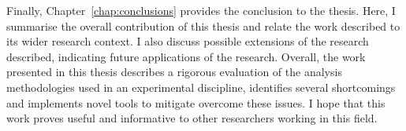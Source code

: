 Finally, Chapter~\ref{chap:conclusions} provides the conclusion to the thesis. Here, I summarise the overall contribution of this thesis and relate the work described to its wider research context. I also discuss possible extensions of the research described, indicating future applications of the research. Overall, the work presented in this thesis describes a rigorous evaluation of the analysis methodologies used in an experimental discipline, identifies several shortcomings and implements novel tools to mitigate overcome these issues. I hope that this work proves useful and informative to other researchers working in this field.


